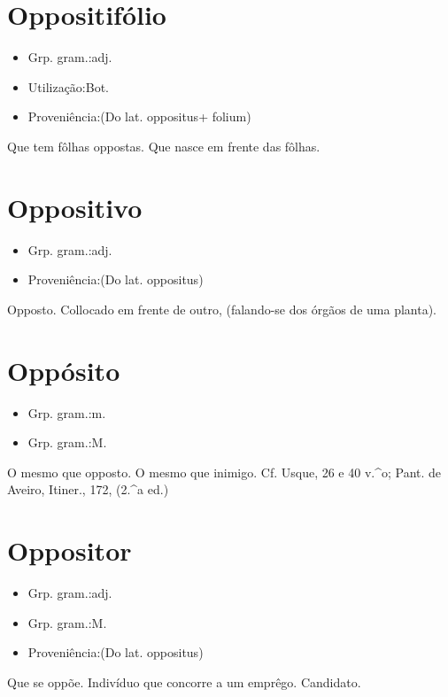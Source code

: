 \section{Oppositifólio}
\begin{itemize}
\item {Grp. gram.:adj.}
\end{itemize}
\begin{itemize}
\item {Utilização:Bot.}
\end{itemize}
\begin{itemize}
\item {Proveniência:(Do lat. \textunderscore oppositus\textunderscore  + \textunderscore folium\textunderscore )}
\end{itemize}
Que tem fôlhas oppostas.
Que nasce em frente das fôlhas.
\section{Oppositivo}
\begin{itemize}
\item {Grp. gram.:adj.}
\end{itemize}
\begin{itemize}
\item {Proveniência:(Do lat. \textunderscore oppositus\textunderscore )}
\end{itemize}
Opposto.
Collocado em frente de outro, (falando-se dos órgãos de uma planta).
\section{Oppósito}
\begin{itemize}
\item {Grp. gram.:m.}
\end{itemize}
\begin{itemize}
\item {Grp. gram.:M.}
\end{itemize}
O mesmo que \textunderscore opposto\textunderscore .
O mesmo que \textunderscore inimigo\textunderscore . Cf. \textunderscore Usque\textunderscore , 26 e 40 v.^o; Pant. de Aveiro, \textunderscore Itiner.\textunderscore , 172, (2.^a ed.)
\section{Oppositor}
\begin{itemize}
\item {Grp. gram.:adj.}
\end{itemize}
\begin{itemize}
\item {Grp. gram.:M.}
\end{itemize}
\begin{itemize}
\item {Proveniência:(Do lat. \textunderscore oppositus\textunderscore )}
\end{itemize}
Que se oppõe.
Indivíduo que concorre a um emprêgo.
Candidato.
